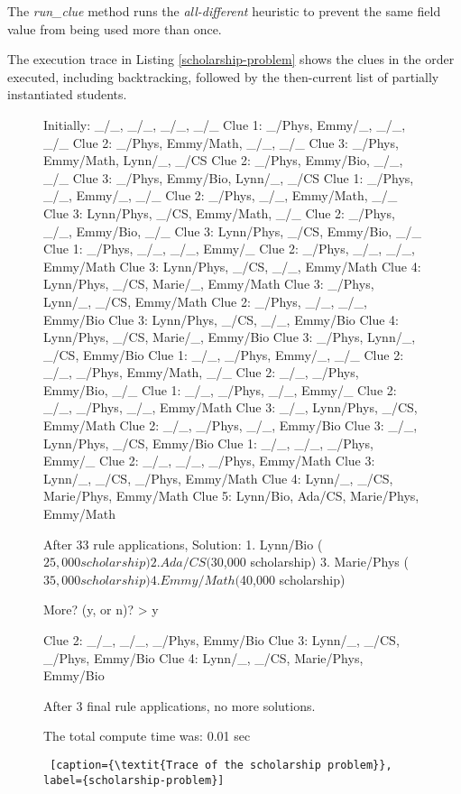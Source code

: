 The \textit{run\_clue} method runs the \textit{all-different} heuristic to prevent the same field value from being used more than once. 

The execution trace in Listing \ref{scholarship-problem} shows the clues in the order executed, including backtracking, followed by the then-current list of partially instantiated students.

\begin{figure}[ht]
    \flushright
\begin{minipage}[c]{0.45\textwidth}
\begin{python1}
Initially: _/_, _/_, _/_, _/_
Clue 1: _/Phys, Emmy/_, _/_, _/_
Clue 2: _/Phys, Emmy/Math, _/_, _/_
Clue 3: _/Phys, Emmy/Math, Lynn/_, _/CS
Clue 2: _/Phys, Emmy/Bio, _/_, _/_
Clue 3: _/Phys, Emmy/Bio, Lynn/_, _/CS
Clue 1: _/Phys, _/_, Emmy/_, _/_
Clue 2: _/Phys, _/_, Emmy/Math, _/_
Clue 3: Lynn/Phys, _/CS, Emmy/Math, _/_
Clue 2: _/Phys, _/_, Emmy/Bio, _/_
Clue 3: Lynn/Phys, _/CS, Emmy/Bio, _/_
Clue 1: _/Phys, _/_, _/_, Emmy/_
Clue 2: _/Phys, _/_, _/_, Emmy/Math
Clue 3: Lynn/Phys, _/CS, _/_, Emmy/Math
Clue 4: Lynn/Phys, _/CS, Marie/_, Emmy/Math
Clue 3: _/Phys, Lynn/_, _/CS, Emmy/Math
Clue 2: _/Phys, _/_, _/_, Emmy/Bio
Clue 3: Lynn/Phys, _/CS, _/_, Emmy/Bio
Clue 4: Lynn/Phys, _/CS, Marie/_, Emmy/Bio
Clue 3: _/Phys, Lynn/_, _/CS, Emmy/Bio
Clue 1: _/_, _/Phys, Emmy/_, _/_
Clue 2: _/_, _/Phys, Emmy/Math, _/_
Clue 2: _/_, _/Phys, Emmy/Bio, _/_
Clue 1: _/_, _/Phys, _/_, Emmy/_
Clue 2: _/_, _/Phys, _/_, Emmy/Math
Clue 3: _/_, Lynn/Phys, _/CS, Emmy/Math
Clue 2: _/_, _/Phys, _/_, Emmy/Bio
Clue 3: _/_, Lynn/Phys, _/CS, Emmy/Bio
Clue 1: _/_, _/_, _/Phys, Emmy/_
Clue 2: _/_, _/_, _/Phys, Emmy/Math
Clue 3: Lynn/_, _/CS, _/Phys, Emmy/Math
Clue 4: Lynn/_, _/CS, Marie/Phys, Emmy/Math
Clue 5: Lynn/Bio, Ada/CS, Marie/Phys, Emmy/Math

After 33 rule applications,
Solution: 
	1. Lynn/Bio	($25,000 scholarship)
	2. Ada/CS	($30,000 scholarship)
	3. Marie/Phys	($35,000 scholarship)
	4. Emmy/Math	($40,000 scholarship)

More? (y, or n)? > y

Clue 2: _/_, _/_, _/Phys, Emmy/Bio
Clue 3: Lynn/_, _/CS, _/Phys, Emmy/Bio
Clue 4: Lynn/_, _/CS, Marie/Phys, Emmy/Bio

After 3 final rule applications, no more solutions.

The total compute time was: 0.01 sec
\end{python1}\linv
\begin{lstlisting} [caption={\textit{Trace of the scholarship problem}}, label={scholarship-problem}]
\end{lstlisting}
\end{minipage} \linv
\end{figure}


